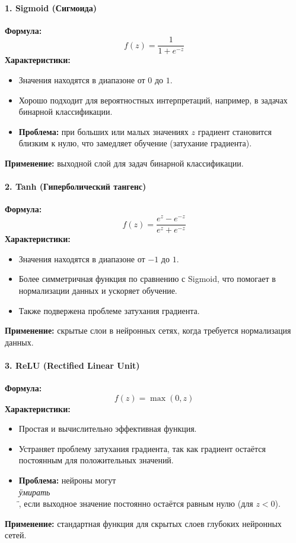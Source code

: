 {\paragraph{1. Sigmoid (Сигмоида)}
\textbf{Формула:}
\[
    f(z) = \frac{1}{1 + e^{-z}}
\]
\textbf{Характеристики:}
\begin{itemize}
    \item Значения находятся в диапазоне от $0$ до $1$.
    \item Хорошо подходит для вероятностных интерпретаций, например, в задачах бинарной классификации.
    \item \textbf{Проблема:} при больших или малых значениях $z$ градиент становится близким к нулю, что замедляет обучение (затухание градиента).
\end{itemize}
\textbf{Применение:} выходной слой для задач бинарной классификации.

\paragraph{2. Tanh (Гиперболический тангенс)}
\textbf{Формула:}
\[
    f(z) = \frac{e^z - e^{-z}}{e^z + e^{-z}}
\]
\textbf{Характеристики:}
\begin{itemize}
    \item Значения находятся в диапазоне от $-1$ до $1$.
    \item Более симметричная функция по сравнению с Sigmoid, что помогает в нормализации данных и ускоряет обучение.
    \item Также подвержена проблеме затухания градиента.
\end{itemize}
\textbf{Применение:} скрытые слои в нейронных сетях, когда требуется нормализация данных.

\paragraph{3. ReLU (Rectified Linear Unit)}
\textbf{Формула:}
\[
    f(z) = \max(0, z)
\]
\textbf{Характеристики:}
\begin{itemize}
    \item Простая и вычислительно эффективная функция.
    \item Устраняет проблему затухания градиента, так как градиент остаётся постоянным для положительных значений.
    \item \textbf{Проблема:} нейроны могут \textit{\\\"умирать\\\"}, если выходное значение постоянно остаётся равным нулю (для $z < 0$).
\end{itemize}
\textbf{Применение:} стандартная функция для скрытых слоев глубоких нейронных сетей.

}
